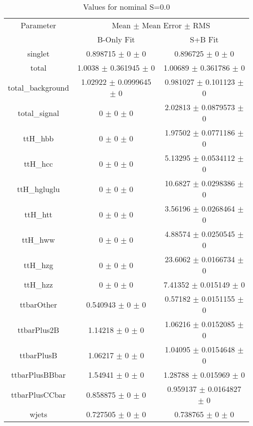 \begin{table}
\centering
\caption{Values for nominal S=0.0}
\begin{tabular}{ccc}
\toprule
Parameter & \multicolumn{2}{c}{Mean $\pm$ Mean Error $\pm$ RMS}\\
 & B-Only Fit & S+B Fit\\
\midrule
singlet & \num{0.898715} $\pm$ \num{0} $\pm$ \num{0} & \num{0.896725} $\pm$ \num{0} $\pm$ \num{0}\\
total & \num{1.0038} $\pm$ \num{0.361945} $\pm$ \num{0} & \num{1.00689} $\pm$ \num{0.361786} $\pm$ \num{0}\\
total\_background & \num{1.02922} $\pm$ \num{0.0999645} $\pm$ \num{0} & \num{0.981027} $\pm$ \num{0.101123} $\pm$ \num{0}\\
total\_signal & \num{0} $\pm$ \num{0} $\pm$ \num{0} & \num{2.02813} $\pm$ \num{0.0879573} $\pm$ \num{0}\\
ttH\_hbb & \num{0} $\pm$ \num{0} $\pm$ \num{0} & \num{1.97502} $\pm$ \num{0.0771186} $\pm$ \num{0}\\
ttH\_hcc & \num{0} $\pm$ \num{0} $\pm$ \num{0} & \num{5.13295} $\pm$ \num{0.0534112} $\pm$ \num{0}\\
ttH\_hgluglu & \num{0} $\pm$ \num{0} $\pm$ \num{0} & \num{10.6827} $\pm$ \num{0.0298386} $\pm$ \num{0}\\
ttH\_htt & \num{0} $\pm$ \num{0} $\pm$ \num{0} & \num{3.56196} $\pm$ \num{0.0268464} $\pm$ \num{0}\\
ttH\_hww & \num{0} $\pm$ \num{0} $\pm$ \num{0} & \num{4.88574} $\pm$ \num{0.0250545} $\pm$ \num{0}\\
ttH\_hzg & \num{0} $\pm$ \num{0} $\pm$ \num{0} & \num{23.6062} $\pm$ \num{0.0166734} $\pm$ \num{0}\\
ttH\_hzz & \num{0} $\pm$ \num{0} $\pm$ \num{0} & \num{7.41352} $\pm$ \num{0.015149} $\pm$ \num{0}\\
ttbarOther & \num{0.540943} $\pm$ \num{0} $\pm$ \num{0} & \num{0.57182} $\pm$ \num{0.0151155} $\pm$ \num{0}\\
ttbarPlus2B & \num{1.14218} $\pm$ \num{0} $\pm$ \num{0} & \num{1.06216} $\pm$ \num{0.0152085} $\pm$ \num{0}\\
ttbarPlusB & \num{1.06217} $\pm$ \num{0} $\pm$ \num{0} & \num{1.04095} $\pm$ \num{0.0154648} $\pm$ \num{0}\\
ttbarPlusBBbar & \num{1.54941} $\pm$ \num{0} $\pm$ \num{0} & \num{1.28788} $\pm$ \num{0.015969} $\pm$ \num{0}\\
ttbarPlusCCbar & \num{0.858875} $\pm$ \num{0} $\pm$ \num{0} & \num{0.959137} $\pm$ \num{0.0164827} $\pm$ \num{0}\\
wjets & \num{0.727505} $\pm$ \num{0} $\pm$ \num{0} & \num{0.738765} $\pm$ \num{0} $\pm$ \num{0}\\
\bottomrule
\end{tabular}
\end{table}